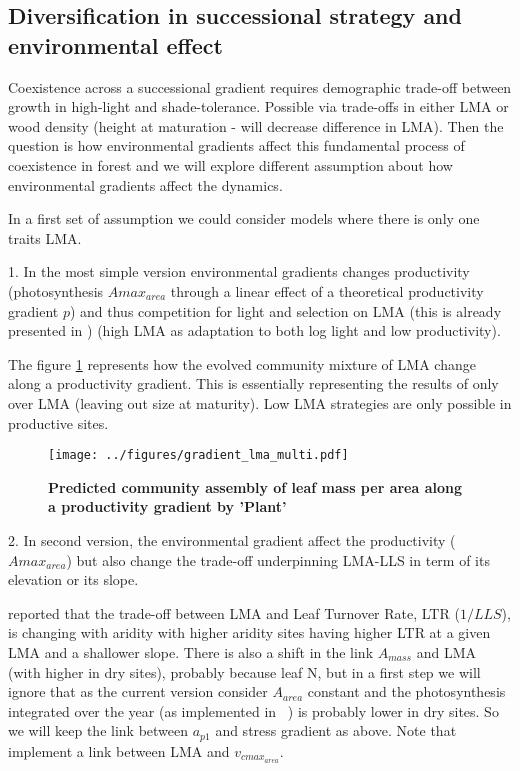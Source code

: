 \documentclass[a4paper,11pt]{article}
\begin{document}
\subsection{Diversification in successional strategy and environmental effect}

Coexistence across a successional gradient requires demographic trade-off between growth in high-light and shade-tolerance. Possible via trade-offs in either LMA or wood density (height at maturation - will decrease difference in LMA). Then the question is how environmental gradients affect this fundamental process of coexistence in forest and we will explore different assumption about how environmental gradients
affect the dynamics.

In a first set of assumption we could consider models where there is only one traits LMA.

\clearpage

1. In the most simple version environmental gradients changes productivity (photosynthesis $A{max}_{area}$ through a linear effect of a theoretical productivity gradient $p$) and
thus competition for light and selection on LMA (this is already presented in \citet{Falster-2017}) (high LMA as adaptation to both log light and low productivity).

The figure \ref{fig:lma} represents how the evolved community mixture of LMA change along a productivity gradient. This is essentially representing the results of \citet{Falster-2017} only over LMA (leaving out size at maturity). Low LMA strategies are only possible in productive sites.

\begin{figure}[ht]
\centering
\texttt{[image: ../figures/gradient\_lma\_multi.pdf]}
\caption{\textbf{Predicted community assembly of leaf mass per area along a productivity gradient by 'Plant' \citep[see][]{Falster-2016}}
\label{fig:lma}}
\end{figure}

\clearpage

2. In second version, the environmental gradient affect the productivity ($A{max}_{area}$) but also change the trade-off underpinning LMA-LLS in term of its elevation or its slope.

\citet{Wright-2005} reported that the trade-off between LMA and Leaf Turnover Rate, LTR ($1/LLS$), is changing with aridity with higher aridity sites having higher LTR at a given LMA and a shallower slope. There is also a shift in the link $A_{mass}$ and LMA (with higher in dry sites), probably because leaf N, but in a first step we will ignore that as the current version consider $A_{area}$ constant and the photosynthesis integrated over the year (as implemented in \plant\ ) is probably lower in dry sites. So we will keep the link between $a_{p1}$ and stress gradient as above. Note that \citet{Sakschewski-2015} implement a link between LMA and $v_{cmax_{area}}$.
\end{document}
